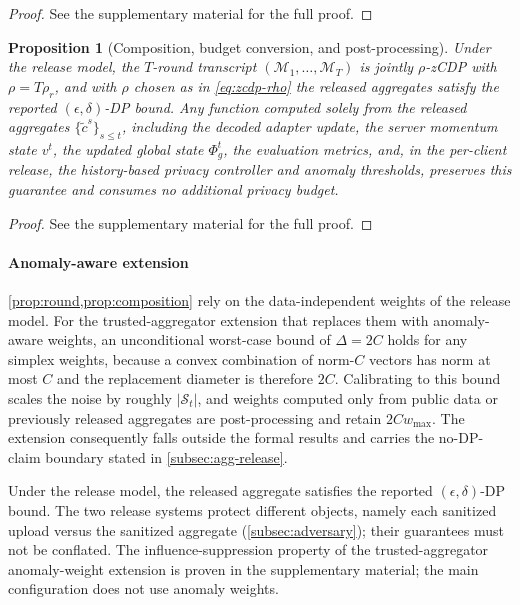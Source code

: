\documentclass[a4paper,fleqn]{cas-dc}
\newtheorem{proposition}{Proposition}
\begin{document}
\par
\begin{proof}
See the supplementary material for the full proof.
\end{proof}
\par
\begin{proposition}[Composition, budget conversion, and post-processing]
\label{prop:composition}
Under the release model, the $T$-round transcript
$(\mathcal{M}_1,\dots,\mathcal{M}_T)$ is jointly $\rho$-zCDP with
$\rho = T\rho_r$, and with $\rho$ chosen as in \eqref{eq:zcdp-rho} the
released aggregates satisfy the reported $(\epsilon,\delta)$-DP bound. Any function computed solely from the
released aggregates $\{\tilde c^s\}_{s \le t}$, including the decoded adapter
update, the server momentum state $v^t$, the updated global state
$\Phi_g^t$, the evaluation metrics, and, in the per-client release, the
history-based privacy controller and anomaly thresholds, preserves this
guarantee and consumes no additional privacy budget.
\end{proposition}
\par
\begin{proof}
See the supplementary material for the full proof.
\end{proof}
\par
\paragraph{Anomaly-aware extension}
\cref{prop:round,prop:composition} rely on the
data-independent weights of the release model. For the trusted-aggregator
extension that replaces them with anomaly-aware weights, an unconditional
worst-case bound of $\Delta = 2C$ holds for any simplex weights, because a
convex combination of norm-$C$ vectors has norm at most $C$ and the
replacement diameter is therefore $2C$. Calibrating to this bound scales the
noise by roughly $|\mathcal{S}_t|$, and weights computed only from public
data or previously released aggregates are post-processing and retain
$2Cw_{\max}$. The extension consequently falls outside the formal results
and carries the no-DP-claim boundary stated in
\cref{subsec:agg-release}.
\par
Under the release model, the released aggregate satisfies the reported
$(\epsilon,\delta)$-DP bound. The two release systems protect different
objects, namely each sanitized upload versus the sanitized aggregate
(\cref{subsec:adversary}); their guarantees must not be conflated. The
influence-suppression property of the trusted-aggregator anomaly-weight
extension is proven in the supplementary material; the main configuration
does not use anomaly weights.
\par
\end{document}
